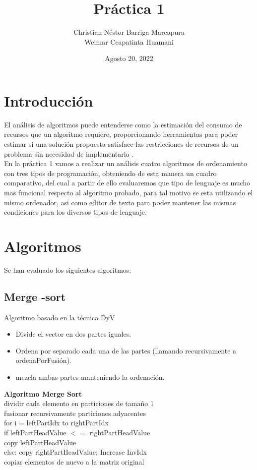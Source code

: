 \documentclass{article}
\title{Práctica 1}
\author{Christian Néstor Barriga Marcapura\\
        Weimar Ccapatinta Huamani}
\date{Agosto 20, 2022}
\begin{document}
\maketitle

\tableofcontents
\newpage
\pagestyle{fancy}
\fancyhf{}
\rfoot{\thepage}{}
\section{Introducción}
\doublespacing El análisis de algoritmos puede entenderse como la estimación del consumo de recursos que un algoritmo requiere, proporcionando herramientas para poder estimar si una solución propuesta satisface las restricciones de recursos de un problema sin necesidad de implementarlo \cite{Villegas Jaramillo Eduardo et all}.\\
En la práctica 1 vamos a realizar un análisis cuatro algoritmos de ordenamiento con tres tipos de programación, obteniendo de esta manera un cuadro comparativo, del cual a partir de ello evaluaremos que tipo de lenguaje es mucho mas funcional respecto al algoritmo probado, para tal motivo se esta utilizando el mismo ordenador, asi como editor de texto para poder mantener las mismas condiciones para los diversos tipos de lenguaje.

\section{Algoritmos}
\doublespacing Se han evaluado los siguientes algoritmos:
\subsection{Merge -sort}
Algoritmo basado en la técnica DyV
\begin{itemize}
    \item Divide el vector en dos partes iguales.
    \item Ordena por separado cada una de las partes (llamando recursivamente a ordenaPorFusión).
    \item mezcla ambas partes manteniendo la ordenación.
\end{itemize}
\textbf{Algoritmo Merge Sort}\\
\newcommand\tab[1][1cm]{\hspace*{#1}}
\textcolor{Micolor1}{
\tab dividir cada elemento en particiones de tamaño 1\\
\tab fusionar recursivamente particiones adyacentes\\}
\tab for i = leftPartIdx to rightPartIdx\\
\tab \tab   if leftPartHeadValue $<=$ rightPartHeadValue\\
\tab \tab \tab      copy leftPartHeadValue\\
\tab \tab    else: copy rightPartHeadValue; Increase InvIdx\\
\textcolor{Micolor1}{
\tab copiar elementos de nuevo a la matriz original}
    
\end{document}
